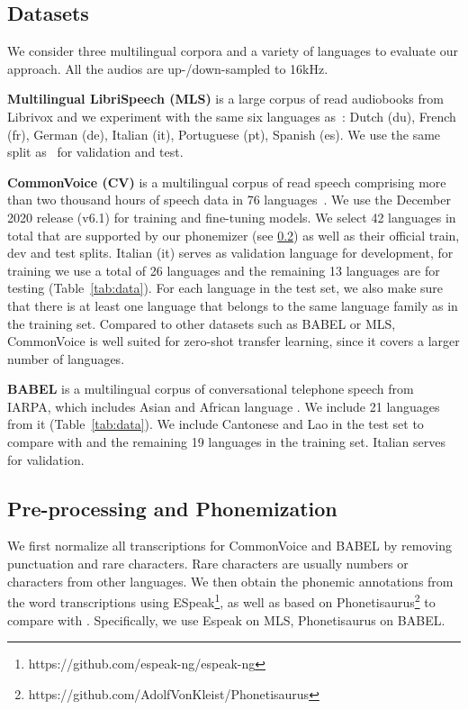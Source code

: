 \documentclass{article}
\begin{document}



\subsection{Datasets}
We consider three multilingual corpora and a variety of languages to evaluate our approach. All the audios are up-/down-sampled to 16kHz.

\textbf{Multilingual LibriSpeech (MLS)} is a large corpus of read audiobooks from Librivox and we experiment with the same six languages as~\cite{baevski2021unsupervised}: Dutch (du), French (fr), German (de), Italian (it), Portuguese (pt), Spanish (es). We use the same split as~\cite{baevski2021unsupervised} for validation and test.


\textbf{CommonVoice (CV)} is a multilingual corpus of read speech comprising more than two thousand hours of speech data in 76 languages~\cite{ardila2019common}. 
We use the December 2020 release (v6.1) for training and fine-tuning models. 
We select 42 languages in total that are supported by our phonemizer (see \textsection\ref{sec:preprocess}) as well as their official train, dev and test splits.
Italian (it) serves as validation language for development, for training we use a total of 26 languages and the remaining 13 languages are for testing (Table~\ref{tab:data}). 
For each language in the test set, we also make sure that there is at least one language that belongs to the same language family as in the training set. 
Compared to other datasets such as BABEL or MLS, CommonVoice is well suited for zero-shot transfer learning, since it covers a larger number of languages.

\textbf{BABEL} is a multilingual corpus of conversational telephone speech from IARPA, which includes Asian and African language \cite{gales2014speech}. 
We include 21 languages from it (Table~\ref{tab:data}). %
We include Cantonese and Lao in the test set to compare with \cite{gaozero} and the remaining 19 languages in the training set. Italian serves for validation.


\subsection{Pre-processing and Phonemization}
\label{sec:preprocess}
We first normalize all transcriptions for CommonVoice and BABEL by removing punctuation and rare characters. 
Rare characters are usually numbers or characters from other languages. 
We then obtain the phonemic annotations from the word transcriptions using ESpeak\footnote{https://github.com/espeak-ng/espeak-ng}, as well as \cite{hasegawa2020grapheme} based on Phonetisaurus\footnote{https://github.com/AdolfVonKleist/Phonetisaurus} to compare with \cite{gaozero}. 
Specifically, we use Espeak on MLS, Phonetisaurus on BABEL. %
\end{document}

